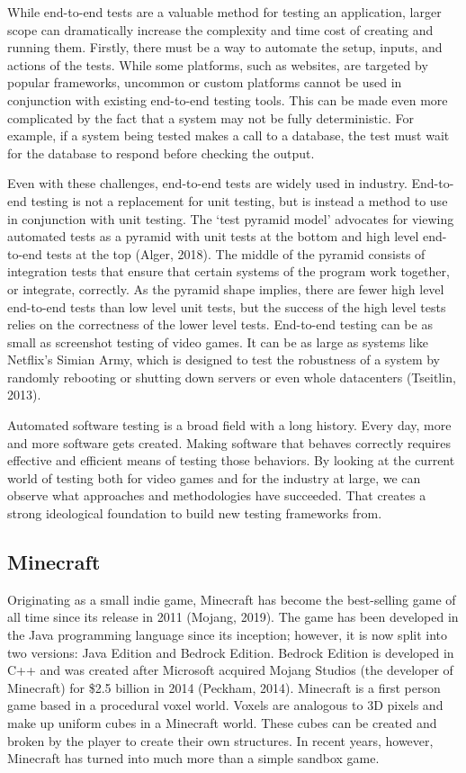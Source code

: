 \documentclass{article}
\begin{document}
\begin{onehalfspacing}
While end-to-end tests are a valuable method for testing an application,
larger scope can dramatically increase the complexity and time cost of
creating and running them. Firstly, there must be a way to automate the
setup, inputs, and actions of the tests. While some platforms, such as
websites, are targeted by popular frameworks, uncommon or custom
platforms cannot be used in conjunction with existing end-to-end testing
tools. This can be made even more complicated by the fact that a system
may not be fully deterministic. For example, if a system being tested
makes a call to a database, the test must wait for the database to
respond before checking the output.

Even with these challenges, end-to-end tests are widely used in
industry. End-to-end testing is not a replacement for unit testing, but
is instead a method to use in conjunction with unit testing. The `test
pyramid model' advocates for viewing automated tests as a pyramid with
unit tests at the bottom and high level end-to-end tests at the top
(Alger, 2018). The middle of the pyramid consists of integration tests
that ensure that certain systems of the program work together, or
integrate, correctly. As the pyramid shape implies, there are fewer high
level end-to-end tests than low level unit tests, but the success of the
high level tests relies on the correctness of the lower level tests.
End-to-end testing can be as small as screenshot testing of video games.
It can be as large as systems like Netflix's Simian Army, which is
designed to test the robustness of a system by randomly rebooting or
shutting down servers or even whole datacenters (Tseitlin, 2013).

Automated software testing is a broad field with a long history. Every
day, more and more software gets created. Making software that behaves
correctly requires effective and efficient means of testing those
behaviors. By looking at the current world of testing both for video
games and for the industry at large, we can observe what approaches and
methodologies have succeeded. That creates a strong ideological
foundation to build new testing frameworks from.

\subsection{Minecraft}

Originating as a small indie game, Minecraft has become the best-selling
game of all time since its release in 2011 (Mojang, 2019). The game has
been developed in the Java programming language since its inception;
however, it is now split into two versions: Java Edition and Bedrock
Edition. Bedrock Edition is developed in C++ and was created after
Microsoft acquired Mojang Studios (the developer of Minecraft) for \$2.5
billion in 2014 (Peckham, 2014). Minecraft is a first person game based
in a procedural voxel world. Voxels are analogous to 3D pixels and make
up uniform cubes in a Minecraft world. These cubes can be created and
broken by the player to create their own structures. In recent years,
however, Minecraft has turned into much more than a simple sandbox game.




\end{onehalfspacing}
\end{document}
